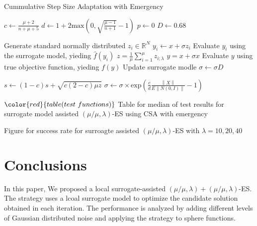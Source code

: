 \begin{algorithm}
\caption{Cummulative Step Size Adaptation with Emergency}
\label{alg}
\begin{algorithmic}[1]
\STATE $c \leftarrow  \frac{\mu +2}{n+\mu+5}$ 
\STATE $d \leftarrow 1 + 2 \text{max}(0, \sqrt{\frac{\mu - 1}{n+1} } - 1 ) $
\STATE $p \leftarrow 0$
\STATE $D \leftarrow 0.68$

		\STATE Generate standard normally distributed $z_i \in \mathbb{R}^N $
		\STATE $y_i \leftarrow x + \sigma z_i$
		\STATE Evaluate $y_i$ using the surrogate model, yieding $\hat{f}(y_i)$
	\ENDFOR
	\STATE $z = \frac{1}{\mu} \sum_{i=1}^{\mu} z_{i;\lambda}$
	\STATE $y = x + \sigma x$
	\STATE Evaluate $y$ using true objective function, yieding $f(y)$
	\STATE Update surrogate modle 
		\STATE $\sigma \leftarrow \sigma D$
		
	\ELSE
		\STATE $s \leftarrow (1-c)s + \sqrt{ c(2-c) \mu z}$
		\STATE $\sigma \leftarrow \sigma \times \text{exp} \left(\frac{c}{d} \frac{\left\lVert X \right\rVert} { E \left\lVert N(0,I) \right\rVert} -1 \right )$
		
	\ENDIF


\ENDWHILE
\end{algorithmic}
\end{algorithm}

$\color{red}{table(test\ functions)}$
Table for median of test results for surrogate model assisted $(\mu/\mu,\lambda)$-ES using CSA with emergency


Figure for success rate for surroagte assisted $(\mu/\mu,\lambda)$-ES with $\lambda = 10,20,40$



\section{Conclusions}
In this paper, We proposed a local surrogate-assisted $(\mu/\mu,\lambda)+(\mu/\mu,\lambda)$-ES. The strategy uses a lcoal surrogate model to optimize the candidate solution obtained in each iteration. The performance is analyzed by adding different levels of Gaussian distributed noise and applying the strategy to sphere functions. 



